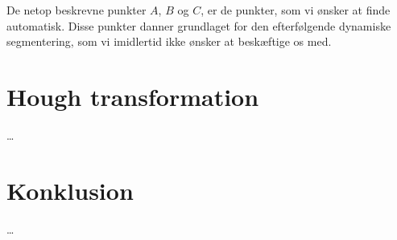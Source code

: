 \documentclass[11pt,a4paper]{article}
\begin{document}
De netop beskrevne punkter $A$, $B$ og $C$, er de punkter, som vi ønsker at finde automatisk. Disse punkter danner grundlaget for den efterfølgende dynamiske segmentering, som vi imidlertid ikke ønsker at beskæftige os med.


\section{Hough transformation}
\ldots

\section{Konklusion}
\ldots



\end{document}
